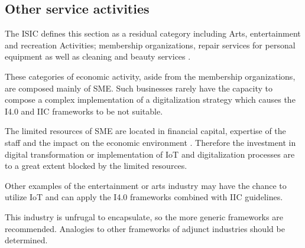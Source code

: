 
\subsection{Other service activities}
The \ac{ISIC} defines this section as a residual category including Arts, entertainment and recreation Activities; membership organizations, repair services for personal equipment as well as cleaning and beauty services \cite[p.262ff.]{ISIC:2008}.

These categories of economic activity, aside from the membership organizations, are composed mainly of \ac{SME}. Such businesses rarely have the capacity to compose a complex implementation of a digitalization strategy which causes the \ac{I4.0} and \ac{IIC} frameworks to be not suitable.

The limited resources of \ac{SME} are located in financial capital, expertise of the staff and the impact on the economic environment \cite{JSBM:JSBM341}. Therefore the investment in digital transformation or implementation of \ac{IoT} and digitalization processes are to a great extent blocked by the limited resources.

Other examples of the entertainment or arts industry may have the chance to utilize \ac{IoT} and can apply the \ac{I4.0} frameworks combined with \ac{IIC} guidelines.

This industry is unfrugal to encapsulate, so the more generic frameworks are recommended. Analogies to other frameworks of adjunct industries should be determined.
